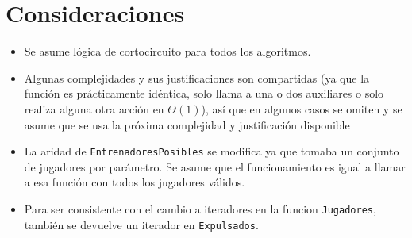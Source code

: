 \section{Consideraciones}

\begin{itemize}
	\item Se asume lógica de cortocircuito para todos los algoritmos.

	\item Algunas complejidades y sus justificaciones son compartidas (ya que la función es prácticamente idéntica, solo llama a una o dos auxiliares o solo realiza alguna otra acción en $\Theta(1)$), así que en algunos casos se omiten y se asume que se usa la próxima complejidad y justificación disponible

	\item La aridad de \texttt{EntrenadoresPosibles} se modifica ya que tomaba un conjunto de jugadores por parámetro. Se asume que el funcionamiento es igual a llamar a esa función con todos los jugadores válidos.

	\item Para ser consistente con el cambio a iteradores en la funcion \texttt{Jugadores}, también se devuelve un iterador en \texttt{Expulsados}.
\end{itemize}